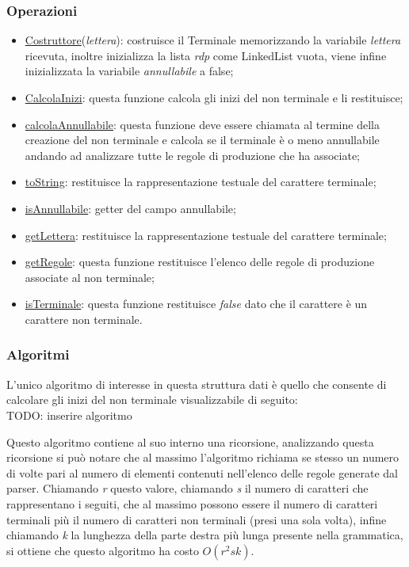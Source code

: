 \documentclass[12pt]{article}
\begin{document}
\subsubsection{Operazioni}
\begin{itemize}
\item\underline{Costruttore}(\textit{lettera}): costruisce il Terminale memorizzando la variabile \textit{lettera} ricevuta, inoltre inizializza la lista \textit{rdp} come LinkedList vuota, viene infine inizializzata la variabile \textit{annullabile} a false;
\item\underline{CalcolaInizi}: questa funzione calcola gli inizi del non terminale e li restituisce;
\item\underline{calcolaAnnullabile}: questa funzione deve essere chiamata al termine della creazione del non terminale e calcola se il terminale è o meno annullabile andando ad analizzare tutte le regole di produzione che ha associate;
\item\underline{toString}: restituisce la rappresentazione testuale del carattere terminale;
\item\underline{isAnnullabile}: getter del campo annullabile;
\item\underline{getLettera}: restituisce la rappresentazione testuale del carattere terminale;
\item\underline{getRegole}: questa funzione restituisce l'elenco delle regole di produzione associate al non terminale;
\item\underline{isTerminale}: questa funzione restituisce \textit{false} dato che il carattere è un carattere non terminale.
\end{itemize}
\subsubsection{Algoritmi}
L'unico algoritmo di interesse in questa struttura dati è quello che consente di calcolare gli inizi del non terminale visualizzabile di seguito:
\\ TODO: inserire algoritmo\par

\label{COSTOINIZI}
Questo algoritmo contiene al suo interno una ricorsione, analizzando questa ricorsione si può notare che al massimo l'algoritmo richiama se stesso un numero di volte pari al numero di elementi contenuti nell'elenco delle regole generate dal parser.
Chiamando \textit{r} questo valore, chiamando \textit{s} il numero di caratteri che rappresentano i seguiti, che al massimo possono essere il numero di caratteri terminali più il numero di caratteri non terminali (presi una sola volta), infine chiamando \textit{k} la lunghezza della parte destra più lunga presente nella grammatica, si ottiene che questo algoritmo ha costo $O(r^2 s k)$.
\end{document}
